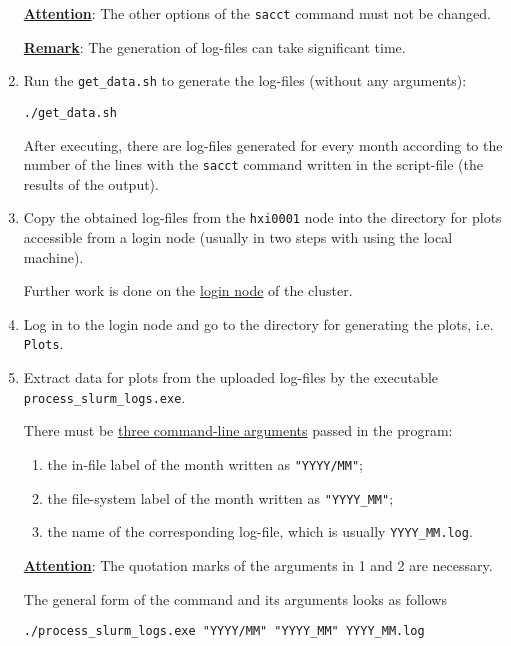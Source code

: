 \documentclass[12pt,a4paper,onecolumn]{article}
\begin{document}
\begin{enumerate}
\underline{\textbf{Attention}}: The other options of the \lstinline{sacct} command must not be changed.

\underline{\textbf{Remark}}: The generation of log-files can take significant time.

\item Run the \lstinline{get_data.sh} to generate the log-files (without any arguments):
\begin{lstlisting}
./get_data.sh
\end{lstlisting}

After executing, there are log-files generated for every month according to the number of the lines with the \lstinline{sacct} command written in the script-file (the results of the output).

\item Copy the obtained log-files from the \lstinline{hxi0001} node into the directory for plots accessible from a login node (usually in two steps with using the local machine).

Further work is done on the \underline{login node} of the cluster.

\item Log in to the login node and go to the directory for generating the plots, i.e. \lstinline{Plots}.

\item Extract data for plots from the uploaded log-files by the executable \lstinline{process_slurm_logs.exe}.

There must be \underline{three command-line arguments} passed in the program:
\begin{enumerate}
\item the in-file label of the month written as \lstinline{"YYYY/MM"};
\item the file-system label of the month written as \lstinline{"YYYY_MM"};
\item the name of the corresponding log-file, which is usually \lstinline{YYYY_MM.log}.
\end{enumerate}
\vspace{\baselineskip}

\underline{\textbf{Attention}}: The quotation marks of the arguments in 1 and 2 are necessary.
\vspace{\baselineskip}

The general form of the command and its arguments looks as follows
\begin{lstlisting}
./process_slurm_logs.exe "YYYY/MM" "YYYY_MM" YYYY_MM.log
\end{lstlisting}


\end{enumerate}
\end{document}
